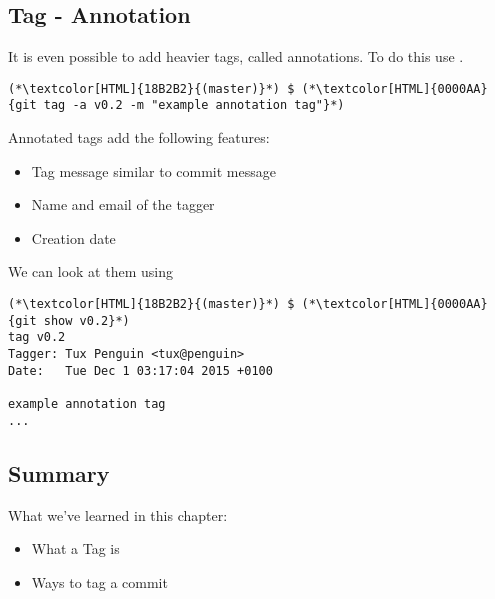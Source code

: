 \subsection{Tag - Annotation}
\begin{frame}[fragile]
  \subslidetitle
  It is even possible to add heavier tags, called annotations. To do this use .

  \begin{lstlisting}
(*\textcolor[HTML]{18B2B2}{(master)}*) $ (*\textcolor[HTML]{0000AA}{git tag -a v0.2 -m "example annotation tag"}*)
\end{lstlisting}

  Annotated tags add the following features:
  \begin{itemize}
    \item Tag message similar to commit message
    \item Name and email of the tagger
    \item Creation date
  \end{itemize}

  We can look at them using 
  \begin{lstlisting}
(*\textcolor[HTML]{18B2B2}{(master)}*) $ (*\textcolor[HTML]{0000AA}{git show v0.2}*)
tag v0.2
Tagger: Tux Penguin <tux@penguin>
Date:   Tue Dec 1 03:17:04 2015 +0100

example annotation tag
...
\end{lstlisting}

\end{frame}

\subsection{Summary}
\begin{frame}[fragile]
\subslidetitle
  What we've learned in this chapter:
  \begin{itemize}
    \item What a Tag is
    \item Ways to tag a commit
  \end{itemize}
\end{frame}
